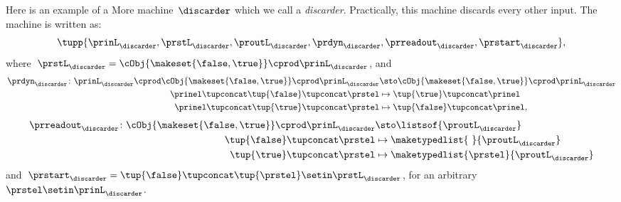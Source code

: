 \begin{example}[Discarder]
    Here is an example of a More machine~$\discarder$ which we call a \emph{discarder}.
    Practically, this machine discards every other input.
    The machine is written as:
    \begin{equation}
        \tupp{\prinL_{\discarder},\prstL_{\discarder},\proutL_{\discarder},\prdyn_{\discarder},\prreadout_{\discarder},\prstart_{\discarder}},
    \end{equation}
    where~$\prstL_{\discarder}= \cObj{\makeset{\false,\true}} \cprod \prinL_\discarder$, and
    \begin{equation}
        \begin{aligned}
            \prdyn_\discarder\colon \prinL_\discarder \cprod \cObj{\makeset{\false,\true}} \cprod \prinL_\discarder & \sto \cObj{\makeset{\false,\true}} \cprod \prinL_\discarder \\
            \prinel \tupconcat \tup{\false} \tupconcat \prstel                                                      & \mapsto \tup{ \true} \tupconcat \prinel \\
            \prinel \tupconcat \tup{\true} \tupconcat \prstel                                                       & \mapsto\tup{ \false} \tupconcat \prinel,
        \end{aligned}
    \end{equation}
    \begin{equation}
        \begin{aligned}
            \prreadout_\discarder\colon \cObj{\makeset{\false,\true}} \cprod \prinL_\discarder & \sto \listsof{\proutL_\discarder} \\
            \tup{\false} \tupconcat \prstel                                                    & \mapsto \maketypedlist{ \ }{\proutL_\discarder} \\
            \tup{\true} \tupconcat \prstel                                                     & \mapsto \maketypedlist{\prstel}{\proutL_\discarder}
        \end{aligned}
    \end{equation}
    and~$\prstart_\discarder = \tup{\false} \tupconcat \tup{\prstel} \setin \prstL_\discarder$, for an arbitrary~$\prstel\setin \prinL_\discarder$.
\end{example}


